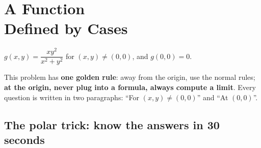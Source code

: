 \renewcommand{\chapribbontext}{Problem 2 \;·\; 7 pts}
\chapter[Problem 2: A Function Defined by Cases]{A Function\\ Defined by Cases}\label{ch:p2}

\begin{examnote}[title={The mock}]
$g(x,y)=\dfrac{xy^2}{x^2+y^2}$ for $(x,y)\ne(0,0)$, and $g(0,0)=0$.
\end{examnote}

\begin{idea}
This problem has \textbf{one golden rule}: away from the origin, use the normal rules; \textbf{at the
origin, never plug into a formula, always compute a limit}. Every question is written in two
paragraphs: ``For $(x,y)\ne(0,0)$'' and ``At $(0,0)$''.
\end{idea}

\section{The polar trick: know the answers in 30 seconds}

